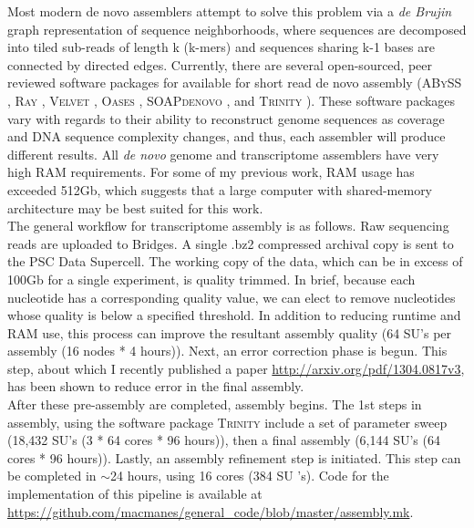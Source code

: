 \documentclass[10.5pt]{article}
\begin{document}
{\noindent
Most modern de novo assemblers attempt to solve this problem via a \textit{de Brujin} graph representation of sequence neighborhoods, where sequences are decomposed into tiled sub-reads of length k (k-mers) and sequences sharing k-1 bases are connected by directed edges.  Currently, there are several open-sourced, peer reviewed software packages for available for short read de novo assembly (\textsc{ABySS} \citep{Birol:2009ia,Simpson:2009iv}, \textsc{Ray} \citep{Boisvert:2010dz}, \textsc{Velvet} \citep{Zerbino:2008bm}, \textsc{Oases} \citep{Schulz:2012je}, \textsc{SOAPdenovo} \citep{Li:2009cx},  and \textsc{Trinity} \citep{Haas:jq,Grabherr:2011jb}).  These software packages vary with regards to their ability to reconstruct genome sequences as coverage and DNA sequence complexity changes, and thus, each assembler will produce different results.  All \textit{de novo} genome and transcriptome assemblers have very high RAM requirements. For some of my previous work, RAM usage has exceeded 512Gb, which suggests that a large computer with shared-memory architecture may be best suited for this work.   \\

\noindent
The general workflow for transcriptome assembly is as follows. Raw sequencing reads are uploaded to Bridges.  A single .bz2 compressed archival copy is sent to the PSC Data Supercell. The working copy of the data, which can be in excess of 100Gb for a single experiment, is quality trimmed. In brief, because each nucleotide has a corresponding quality value, we can elect to remove nucleotides whose quality is below a specified threshold. In addition to reducing runtime and RAM use, this process can improve the resultant assembly quality (64 SU's per assembly (16 nodes * 4 hours)). Next, an error correction phase is begun.  This step, about which I recently published a paper \url{http://arxiv.org/pdf/1304.0817v3}, has been shown to reduce error in the final assembly.  \\

\noindent
After these pre-assembly are completed, assembly begins. The 1st steps in assembly, using the software package \textsc{Trinity} include a set of parameter sweep (18,432 SU's (3 * 64 cores * 96 hours)), then a final assembly (6,144 SU's (64 cores * 96 hours)). Lastly, an assembly refinement step is initiated. This step can be completed in $\sim$24 hours, using 16 cores (384 SU
's). Code for the implementation of this pipeline is available at \url{https://github.com/macmanes/general_code/blob/master/assembly.mk}.  \\

}
\end{document}
